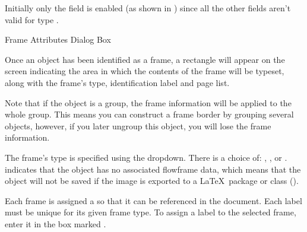 
Initially only the  field
is enabled (as shown in ) since all the other
fields aren't valid for type .


{}
{Frame Attributes Dialog Box}

Once an \gls*{object} has been identified as a frame, a
 rectangle will appear on the screen indicating the area in
which the contents of the frame will be typeset, along with the
frame's type, identification label and page list.

\begin{information}
Note that if the \gls*{object} is a \gls{group}, the frame
information will be applied to the whole group. This means you can
construct a frame border by grouping several objects, however, if
you later ungroup this \gls*{object}, you will lose the frame
information.
\end{information}


The frame's type is specified using the 
 \gls*{dropdown}. There is a choice of:
, ,
 or .
 indicates that the \gls{object} has
no associated flowframe data, which means that the object will not
be saved if the image is exported to a \LaTeX\ package or
class ().


Each frame is assigned a  so that it can be referenced in the
document. Each label must be unique for its given frame type.  To
assign a label to the selected frame, enter it in the box
marked .


